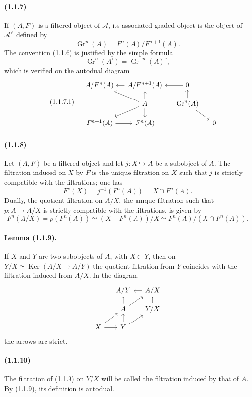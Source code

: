 \documentclass[10pt]{article}
\newcommand{\Z}{\mathbb Z}
\newcommand{\Gr}{\operatorname{Gr}}
\newcommand{\Ker}{\operatorname{Ker}}
\newcommand{\calA}{\mathcal A}
\begin{document}
\paragraph{(1.1.7)} If $(A,F)$ is a filtered object of $\calA$, its associated graded object is the object of $\calA^{\Z}$ defined by
\[
\Gr^n(A)=F^n(A)/F^{n+1}(A).
\]
The convention (1.1.6) is justified by the simple formula
\[
\Gr^n(A^{\circ})=\Gr^{-n}(A)^{\circ},
\]
which is verified on the autodual diagram
\begin{equation}\tag{1.1.7.1}
\begin{tikzcd}[column sep=1.2em,row sep=1.0em]
& A/F^n(A) & A/F^{n+1}(A) \arrow[l] & 0 \arrow[l] \\
& & A \arrow[ul] \arrow[u] \arrow[dl] \arrow[d] & \Gr^n(A) \arrow[u] \arrow[dr] \\
& F^{n+1}(A) \arrow[r] & F^n(A) & & 0
\end{tikzcd}
\end{equation}

\paragraph{(1.1.8)} Let $(A,F)$ be a filtered object and let $j:X\hookrightarrow A$ be a subobject of $A$. The filtration induced on $X$ by $F$ is the unique filtration on $X$ such that $j$ is strictly compatible with the filtrations; one has
\[
F^n(X)=j^{-1}(F^n(A))=X\cap F^n(A).
\]
Dually, the quotient filtration on $A/X$, the unique filtration such that $p:A\to A/X$ is strictly compatible with the filtrations, is given by
\[
F^n(A/X)=p(F^n(A))\simeq (X+F^n(A))/X\simeq F^n(A)/(X\cap F^n(A)).
\]

\paragraph{Lemma (1.1.9).} If $X$ and $Y$ are two subobjects of $A$, with $X\subset Y$, then on $Y/X\simeq\Ker(A/X\to A/Y)$ the quotient filtration from $Y$ coincides with the filtration induced from $A/X$. In the diagram
\[
\begin{tikzcd}[column sep=1.3em,row sep=1.0em]
& A/Y & A/X \arrow[l] \\
& A \arrow[u] \arrow[ur] & Y/X \arrow[u] \\
X \arrow[ur] \arrow[r] & Y \arrow[u] \arrow[ur] &
\end{tikzcd}
\]
the arrows are strict.

\paragraph{(1.1.10)} The filtration of (1.1.9) on $Y/X$ will be called the filtration induced by that of $A$. By (1.1.9), its definition is autodual.
\end{document}
